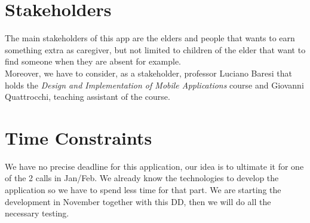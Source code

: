 \documentclass[../../dd.tex]{subfiles}
\begin{document}
    \section{Stakeholders}
    The main stakeholders of this app are the elders and people that wants to earn something extra as caregiver,
    but not limited to children of the elder that want to find someone when they are absent for example.
    \\

    Moreover, we have to consider, as a stakeholder, professor Luciano Baresi that
    holds the \textit{Design and Implementation of Mobile Applications} course and Giovanni Quattrocchi,
    teaching assistant of the course.

    \section{Time Constraints}
    We have no precise deadline for this application, our idea is to ultimate it for one of the 2 calls in Jan/Feb.
    We already know the technologies to develop the application so we have to spend less time for that part.
    We are starting the development in November together with this DD, then we will do all the necessary testing.
\end{document}
